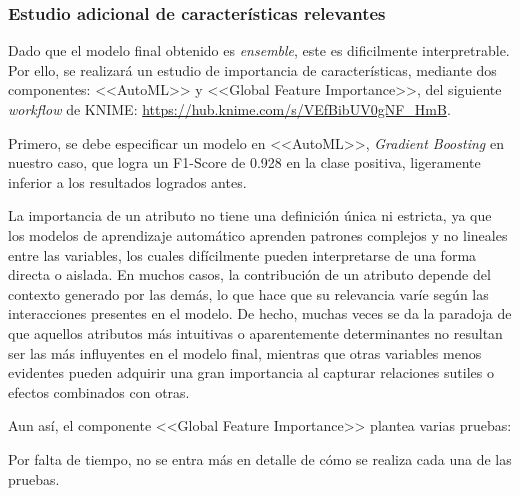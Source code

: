 
\subsubsection{Estudio adicional de características relevantes}

Dado que el modelo final obtenido es \textit{ensemble}, este es dificilmente interpretrable. Por ello, se realizará un estudio de importancia de características, mediante dos componentes: <<AutoML>> y <<Global Feature Importance>>, del siguiente \textit{workflow} de KNIME: \url{https://hub.knime.com/s/VEfBibUV0gNF_HmB}. 

Primero, se debe especificar un modelo en <<AutoML>>, \textit{Gradient Boosting} en nuestro caso, que logra un F1-Score de 0.928 en la clase positiva, ligeramente inferior a los resultados logrados antes.

La importancia de un atributo no tiene una definición única ni estricta, ya que los modelos de aprendizaje automático aprenden patrones complejos y no lineales entre las variables, los cuales difícilmente pueden interpretarse de una forma directa o aislada. En muchos casos, la contribución de un atributo depende del contexto generado por las demás, lo que hace que su relevancia varíe según las interacciones presentes en el modelo. De hecho, muchas veces se da la paradoja de que aquellos atributos más intuitivas o aparentemente determinantes no resultan ser las más influyentes en el modelo final, mientras que otras variables menos evidentes pueden adquirir una gran importancia al capturar relaciones sutiles o efectos combinados con otras.

Aun así, el componente <<Global Feature Importance>> plantea varias pruebas:

\begin{tcolorbox}
    [colback=gray!5!white, colframe=gray!60!black, title=NOTA, breakable]

    Por falta de tiempo, no se entra más en detalle de cómo se realiza cada una de las pruebas.

\end{tcolorbox}

